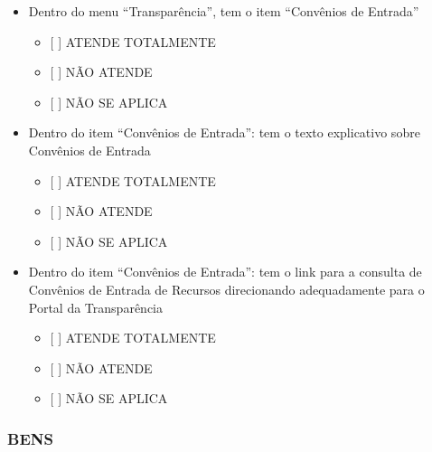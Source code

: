 \documentclass[]{book}
\providecommand{\tightlist}{%
  \setlength{\itemsep}{0pt}\setlength{\parskip}{0pt}}
\begin{document}
\begin{itemize}
\tightlist
\item
  Dentro do menu ``Transparência'', tem o item ``Convênios de Entrada''

  \begin{itemize}
  \tightlist
  \item
    {[} {]} ATENDE TOTALMENTE
  \item
    {[} {]} NÃO ATENDE
  \item
    {[} {]} NÃO SE APLICA
  \end{itemize}
\item
  Dentro do item ``Convênios de Entrada'': tem o texto explicativo sobre Convênios de Entrada

  \begin{itemize}
  \tightlist
  \item
    {[} {]} ATENDE TOTALMENTE
  \item
    {[} {]} NÃO ATENDE
  \item
    {[} {]} NÃO SE APLICA
  \end{itemize}
\item
  Dentro do item ``Convênios de Entrada'': tem o link para a consulta de Convênios de Entrada de Recursos direcionando adequadamente para o Portal da Transparência

  \begin{itemize}
  \tightlist
  \item
    {[} {]} ATENDE TOTALMENTE
  \item
    {[} {]} NÃO ATENDE
  \item
    {[} {]} NÃO SE APLICA
  \end{itemize}
\end{itemize}

\hypertarget{bens-1}{%
\subsubsection*{BENS}\label{bens-1}}
\end{document}
